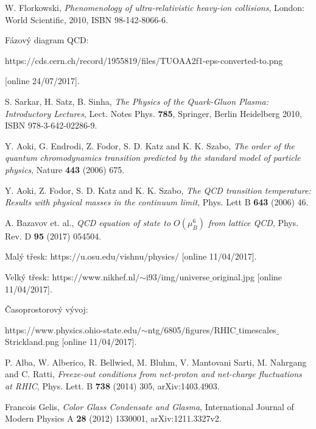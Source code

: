 \documentclass[12pt,titlepage,twoside]{article}
\numberwithin{equation}{section}
\numberwithin{figure}{section}
\numberwithin{table}{section}
\begin{document}
\clearpage

\begin{thebibliography}{99}
	
	W. Florkowski, \textit{Phenomenology of ultra-relativistic heavy-ion collisions}, London: World Scientific, 2010, ISBN 98-142-8066-6.
	
	Fázový diagram QCD:
	 
	 https:$//$cds.cern.ch$/$record$/$1955819$/$files$/$TUOAA2f1-eps-converted-to.png
	 
	[online 24/07/2017].
	
	 S. Sarkar, H. Satz, B. Sinha, \textit{The Physics of the Quark-Gluon Plasma: Introductory Lectures}, Lect. Notes Phys. {\bf 785}, Springer, Berlin Heidelberg 2010, ISBN 978-3-642-02286-9.
	
	Y. Aoki, G. Endrodi, Z. Fodor, S. D. Katz and K. K. Szabo, \textit{The order of the quantum chromodynamics transition predicted by the standard model of particle physics}, Nature {\bf 443} (2006) 675.
	
	Y. Aoki, Z. Fodor, S. D. Katz and K. K. Szabo, \textit{The QCD transition temperature: Results with physical masses in the continuum limit}, Phys. Lett B {\bf 643} (2006) 46.
	
	A. Bazavov et. al., \textit{QCD equation of state to $O(\mu _{B} ^{6} )$ from lattice QCD}, Phys. Rev. D {\bf 95} (2017) 054504. 
	
	Malý třesk: https:$//$u.osu.edu$/$vishnu$/$physics$/$
	[online 11/04/2017].
	
	Velký třesk: https:$//$www.nikhef.nl$/$$\sim$i93$/$img$/$universe$\_$original.jpg 
	[online 11/04/2017].
	
	Časoprostorový vývoj:
	
	https://www.physics.ohio-state.edu$/$$\sim$ntg$/$6805$/$figures$/$RHIC$\_$timescales$\_$Strickland.png
	[online 11/04/2017].

    P. Alba, W. Alberico, R. Bellwied, M. Bluhm, V. Mantovani Sarti, M. Nahrgang and C. Ratti, \textit{Freeze-out conditions from net-proton and net-charge fluctuations at RHIC}, Phys. Lett. B {\bf 738} (2014) 305, arXiv:1403.4903.
    
    Francois Gelis, \textit{Color Glass Condensate and Glasma}, International Journal of Modern Physics A {\bf 28} (2012) 1330001, arXiv:1211.3327v2.
    

\end{thebibliography}
\end{document}
